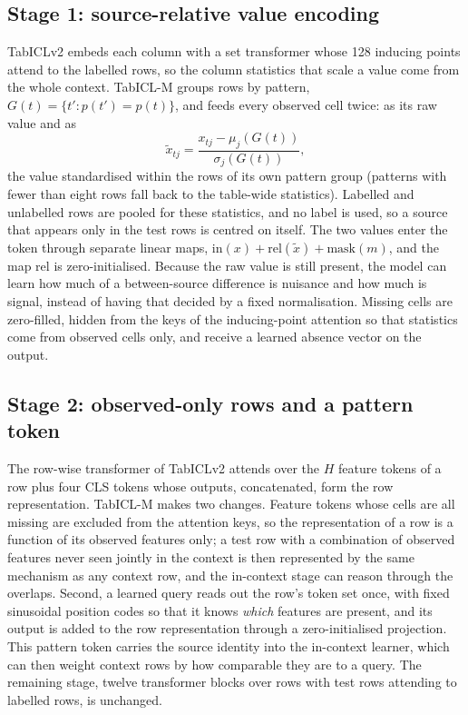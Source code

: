 \documentclass[11pt]{article}
\begin{document}
\subsection{Stage 1: source-relative value encoding}

TabICLv2 embeds each column with a set transformer whose 128 inducing points attend to
the labelled rows, so the column statistics that scale a value come from the whole
context. TabICL-M groups rows by pattern, $G(t) = \{t' : p(t') = p(t)\}$, and feeds every
observed cell twice: as its raw value and as
\begin{equation}
\tilde x_{tj} = \frac{x_{tj} - \mu_j(G(t))}{\sigma_j(G(t))},
\end{equation}
the value standardised within the rows of its own pattern group (patterns with fewer
than eight rows fall back to the table-wide statistics). Labelled and unlabelled rows
are pooled for these statistics, and no label is used, so a source that appears only
in the test rows is centred on itself. The two values enter the token through separate
linear maps, $\mathrm{in}(x) + \mathrm{rel}(\tilde x) + \mathrm{mask}(m)$, and the
map $\mathrm{rel}$ is zero-initialised. Because the raw value is still present, the
model can learn how much of a between-source difference is nuisance and how much is
signal, instead of having that decided by a fixed normalisation. Missing cells are
zero-filled, hidden from the keys of the inducing-point attention so that statistics
come from observed cells only, and receive a learned absence vector on the output.

\subsection{Stage 2: observed-only rows and a pattern token}

The row-wise transformer of TabICLv2 attends over the $H$ feature tokens of a row plus
four CLS tokens whose outputs, concatenated, form the row representation. TabICL-M
makes two changes. Feature tokens whose cells are all missing are excluded from the
attention keys, so the representation of a row is a function of its observed features
only; a test row with a combination of observed features never seen jointly in the
context is then represented by the same mechanism as any context row, and the
in-context stage can reason through the overlaps. Second, a learned query reads out
the row's token set once, with fixed sinusoidal position codes so that it knows
\emph{which} features are present, and its output is added to the row representation
through a zero-initialised projection. This pattern token carries the source identity
into the in-context learner, which can then weight context rows by how comparable
they are to a query. The remaining stage, twelve transformer blocks over rows with
test rows attending to labelled rows, is unchanged.
\end{document}
